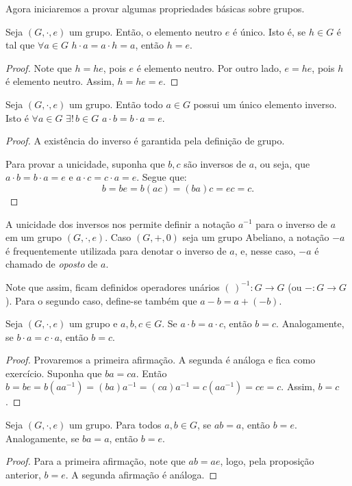 Agora iniciaremos a provar algumas propriedades básicas sobre grupos.
\begin{prop}\label{prop:group_uniqueNeutral}
    Seja $(G,\cdot,e)$ um grupo.
    Então, o elemento neutro $e$ é único.
    Isto é, se $h \in G$ é tal que $\forall a \in G$ $h \cdot a = a \cdot h = a$, então $h = e$.
\end{prop}
\begin{proof}
    Note que $h=he$, pois $e$ é elemento neutro.
    Por outro lado, $e=he$, pois $h$ é elemento neutro.
    Assim, $h=he=e$.
\end{proof}

\begin{prop}\label{prop:group_uniqueInverse}
    Seja $(G,\cdot,e)$ um grupo.
    Então todo $a \in G$ possui um único elemento inverso.
Isto é $\forall a \in G$ $\exists!\, b \in G$ $a \cdot b = b \cdot a = e$.
\end{prop}
\begin{proof}
    A existência do inverso é garantida pela definição de grupo.
    
    Para provar a unicidade, suponha que $b, c$ são inversos de $a$, ou seja, que $a \cdot b = b \cdot a = e$ e $a \cdot c = c \cdot a = e$.
    Segue que:
    $$b=be=b(ac)=(ba)c=ec=c.$$
\end{proof}

A unicidade dos inversos nos permite definir a notação $a^{-1}$ para o inverso de $a$ em um grupo $(G,\cdot,e)$.
Caso $(G, +, 0)$ seja um grupo Abeliano, a notação $-a$ é frequentemente utilizada para denotar o inverso de $a$, e, nesse caso, $-a$ é chamado de \emph{oposto} de $a$.

Note que assim, ficam definidos operadores unários $(\,)^{-1}:G\rightarrow G$ (ou $-:G\rightarrow G$).
Para o segundo caso, define-se também que $a-b=a+(-b)$.

\begin{prop}[Cancelamento]\label{prop:group_cancel}
    Seja $(G,\cdot,e)$ um grupo e $a,b,c \in G$.
    Se $a \cdot b = a \cdot c$, então $b=c$.
    Analogamente, se $b \cdot a = c \cdot a$, então $b=c$.
\end{prop}
\begin{proof}
Provaremos a primeira afirmação.
A segunda é análoga e fica como exercício.
    Suponha que $ba=ca$.
Então $b=be=b(aa^{-1})=(ba)a^{-1}=(ca)a^{-1}=c(aa^{-1})=ce=c$.
Assim, $b=c$.
\end{proof}

\begin{corol}[Cancelamento II]
    Seja $(G,\cdot,e)$ um grupo.
    Para todos $a, b \in G$, se $ab=a$, então $b=e$.
Analogamente, se $ba=a$, então $b=e$.
\end{corol}
\begin{proof}
    Para a primeira afirmação, note que $ab=ae$, logo, pela proposição anterior, $b=e$.
    A segunda afirmação é análoga.
\end{proof}

